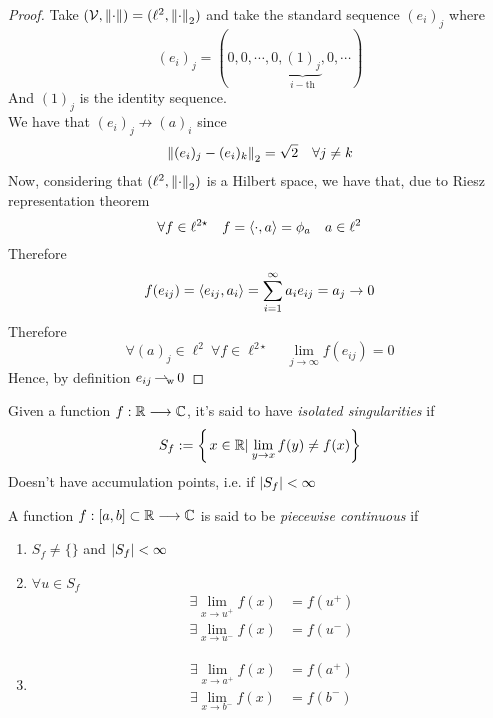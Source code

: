 \documentclass[../complete.tex]{subfiles}
\begin{document}
\begin{proof}
	Take $(\V,\norm{\cdot})=(\ell^2,\pnorm[2]{\cdot})$ and take the standard sequence $(e_i)_j$ where
	\begin{equation*}
		(e_i)_j=(0,0,\cdots,0,\underbrace{(1)_j}_{i-\text{th}},0,\cdots)
	\end{equation*}
	And $(1)_j$ is the identity sequence.\\
	We have that $(e_i)_j\not\to(a)_i$ since
	\begin{equation*}
		\pnorm[2]{(e_i)_j-(e_i)_k}=\sqrt{2}\quad\forall j\ne k
	\end{equation*}
	Now, considering that $(\ell^2,\pnorm[2]{\cdot})$ is a Hilbert space, we have that, due to Riesz representation theorem
	\begin{equation*}
		\forall f\in\ell^{2\star}\quad f=\spr{\cdot}{a}=\phi_a\quad a\in\ell^2
	\end{equation*}
	Therefore
	\begin{equation*}
		f(e_{ij})=\spr{e_{ij}}{a_i}=\sum_{i=1}^\infty a_ie_{ij}=a_j\to0
	\end{equation*}
	Therefore
	\begin{equation*}
		\forall(a)_j\in\ell^2\ \forall f\in\ell^{2\star}\quad\lim_{j\to\infty}f(e_{ij})=0
	\end{equation*}
	Hence, by definition $e_{ij}\wto0$
\end{proof}
\begin{dfn}
	Given a function $f:\R\fto\Cf$, it's said to have \textit{isolated singularities} if
	\begin{equation*}
		S_f:=\left\{ \derin{x\in\R}\lim_{y\to x}f(y)\ne f(x) \right\}
	\end{equation*}
	Doesn't have accumulation points, i.e. if $\abs{S_f}<\infty$
\end{dfn}
\begin{dfn}
	A function $f:[a,b]\subset\R\fto\Cf$ is said to be \textit{piecewise continuous} if
	\begin{enumerate}
	\item $S_f\ne\{\}$ and $\abs{S_f}<\infty$
	\item $\forall u\in S_f$
		\begin{equation}
			\begin{aligned}
				\exists\lim_{x\to u^+}f(x)&=f(u^+)\\
				\exists\lim_{x\to u^-}f(x)&=f(u^-)
			\end{aligned}
			\label{eq:pwcont1}
		\end{equation}
	\item \begin{equation}
			\begin{aligned}
				\exists\lim_{x\to a^+}f(x)&=f(a^+)\\
				\exists\lim_{x\to b^-}f(x)&=f(b^-)
			\end{aligned}
			\label{eq:pwcont2}
		\end{equation}
	\end{enumerate}
\end{dfn}
\end{document}
